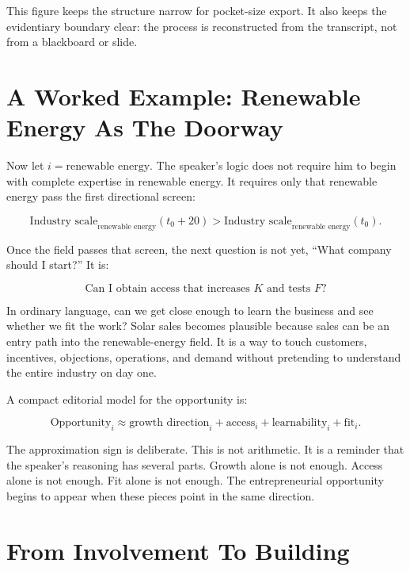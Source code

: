 This figure keeps the structure narrow for pocket-size export. It also keeps the evidentiary boundary clear: the process is reconstructed from the transcript, not from a blackboard or slide.

\section{A Worked Example: Renewable Energy As The Doorway}

Now let \(i=\text{renewable energy}\). The speaker's logic does not require him to begin with complete expertise in renewable energy. It requires only that renewable energy pass the first directional screen:

\begin{equation}
\text{Industry scale}_{\text{renewable energy}}(t_0+20)
>
\text{Industry scale}_{\text{renewable energy}}(t_0).
\end{equation}

Once the field passes that screen, the next question is not yet, ``What company should I start?'' It is:

\begin{equation}
\text{Can I obtain access that increases } K
\text{ and tests } F?
\end{equation}

In ordinary language, can we get close enough to learn the business and see whether we fit the work? Solar sales becomes plausible because sales can be an entry path into the renewable-energy field. It is a way to touch customers, incentives, objections, operations, and demand without pretending to understand the entire industry on day one.

A compact editorial model for the opportunity is:

\begin{equation}
\text{Opportunity}_i
\approx
\text{growth direction}_i
+
\text{access}_i
+
\text{learnability}_i
+
\text{fit}_i.
\end{equation}

The approximation sign is deliberate. This is not arithmetic. It is a reminder that the speaker's reasoning has several parts. Growth alone is not enough. Access alone is not enough. Fit alone is not enough. The entrepreneurial opportunity begins to appear when these pieces point in the same direction.

\section{From Involvement To Building}

